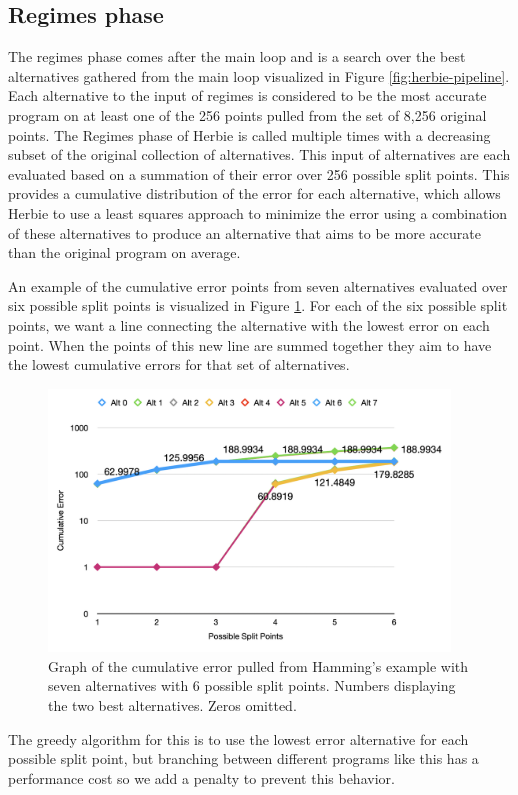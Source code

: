 \documentclass{article}
\begin{document}
\subsection{Regimes phase}
The regimes phase comes after the main loop and is a search over the best alternatives gathered from the main loop visualized in Figure \ref{fig:herbie-pipeline}.  Each alternative to the input of regimes is considered to be the most accurate program on at least one of the 256 points pulled from the set of 8,256 original points. The Regimes phase of Herbie is called multiple times with a decreasing subset of the original collection of alternatives. This input of alternatives are each evaluated based on a summation of their error over 256 possible split points. This provides a cumulative distribution of the error for each alternative, which allows Herbie to use a least squares approach to minimize the error using a combination of these alternatives to produce an alternative that aims to be more accurate than the original program on average. 

An example of the cumulative error points from seven alternatives evaluated over six possible split points is visualized in Figure \ref{fig:cumulative-error}. For each of the six possible split points, we want a line connecting the alternative with the lowest error on each point. When the points of this new line are summed together they aim to have the lowest cumulative errors for that set of alternatives.

\begin{figure}[htbp]
\begin{center}
\includegraphics[width=0.95\textwidth]{cumulative-error-graph.png}
\caption{Graph of the cumulative error pulled from Hamming's example with seven alternatives with 6 possible split points. Numbers displaying the two best alternatives. Zeros omitted.}
\label{fig:cumulative-error} 
\end{center}
\end{figure}
The greedy algorithm for this is to use the lowest error alternative for each possible split point, but branching between different programs like this has a performance cost so we add a penalty to prevent this behavior. 
\end{document}
